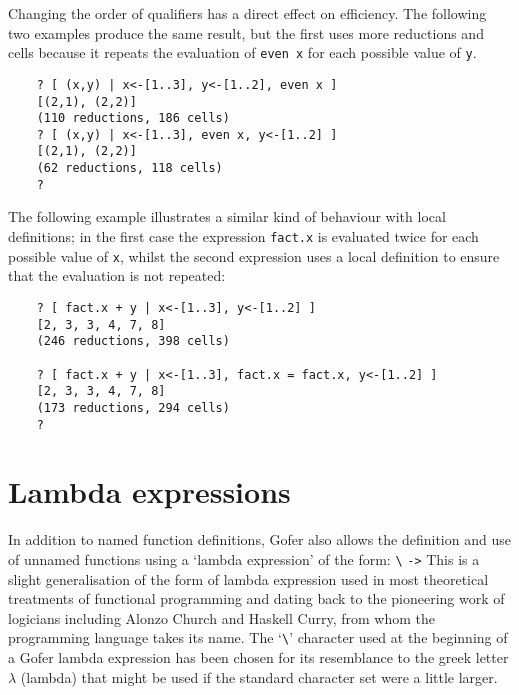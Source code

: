 \IT  Changing  the  order  of  qualifiers  has  a  direct   effect   on
     efficiency.  The following two examples produce the  same  result,
     but the first uses more reductions and cells  because  it  repeats
     the evaluation of \verb"even x" for each possible value of \verb"y".
\begin{verbatim}
    ? [ (x,y) | x<-[1..3], y<-[1..2], even x ]
    [(2,1), (2,2)]
    (110 reductions, 186 cells)
    ? [ (x,y) | x<-[1..3], even x, y<-[1..2] ]
    [(2,1), (2,2)]
    (62 reductions, 118 cells)
    ? 
\end{verbatim}
     The following example illustrates a similar kind of behaviour with
     local definitions; in the first case the expression  \verb"fact.x"  is
     evaluated twice for each possible value of \verb"x", whilst the  second
     expression uses a local definition to ensure that  the  evaluation
     is not repeated:
\begin{verbatim}
    ? [ fact.x + y | x<-[1..3], y<-[1..2] ]
    [2, 3, 3, 4, 7, 8]
    (246 reductions, 398 cells)

    ? [ fact.x + y | x<-[1..3], fact.x = fact.x, y<-[1..2] ]
    [2, 3, 3, 4, 7, 8]
    (173 reductions, 294 cells)
    ?
\end{verbatim}
\EI

\section{Lambda expressions}
In addition to  named  function  definitions,  Gofer  also  allows  the
definition and use of unnamed functions using a `lambda expression'  of
the form:
\BQ
    \verb"\"  \verb"->" 
\EQ
This  is  a  slight  generalisation  of  the  form  of  lambda
expression  used  in  most   theoretical   treatments   of   functional
programming and  dating  back  to  the  pioneering  work  of  logicians
including Alonzo Church and Haskell Curry, from whom the programming language
takes its name.  The `\verb"\"' character used at the  beginning  of  a  Gofer
lambda expression has been chosen for  its  resemblance  to  the  greek
letter $\lambda$ (lambda)
that might be used if the standard character set  were  a
little larger.


